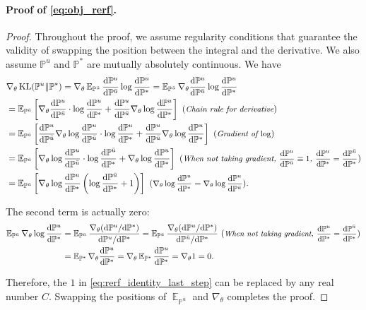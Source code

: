\documentclass{article}
\theoremstyle{remark}
\newcommand{\ro}[1]{\left(#1\right)} %
\newcommand{\sq}[1]{\left[#1\right]} %
\renewcommand{\P}{\mathbb{P}}
\newcommand{\E}{\operatorname{\mathbb{E}}}
\renewcommand{\d}{\mathrm{d}}
\newcommand{\de}[2]{\frac{\mathrm{d}#1}{\mathrm{d}#2}} %
\newcommand{\kl}{\operatorname{KL}}
\newcommand{\ub}{{\bar{u}}}
\begin{document}
\paragraph{Proof of \cref{eq:obj_rerf}.}
\begin{proof}
Throughout the proof, we assume regularity conditions that guarantee the validity of swapping the position between the integral and the derivative. We also assume $\P^u$ and $\P^*$ are mutually absolutely continuous. We have
\begin{align}
    &\nabla_\theta\kl(\P^u\|\P^*)=\nabla_\theta\E_{\P^\ub}\de{\P^u}{\P^\ub}\log\de{\P^u}{\P^*}=\E_{\P^\ub}\nabla_\theta\de{\P^u}{\P^\ub}\log\de{\P^u}{\P^*}\nonumber\\
    &=\E_{\P^\ub}\sq{\nabla_\theta\de{\P^u}{\P^\ub}\cdot\log\de{\P^u}{\P^*}+\de{\P^u}{\P^\ub}\nabla_\theta\log\de{\P^u}{\P^*}}~(\textit{\small Chain rule for derivative})\nonumber\\
    &=\E_{\P^\ub}\sq{\de{\P^u}{\P^\ub}\nabla_\theta\log\de{\P^u}{\P^\ub}\cdot\log\de{\P^u}{\P^*}+\de{\P^u}{\P^\ub}\nabla_\theta\log\de{\P^u}{\P^*}}\nonumber~(\textit{\small Gradient of $\log$})\\
    &=\E_{\P^\ub}\sq{\nabla_\theta\log\de{\P^u}{\P^\ub}\cdot\log\de{\P^\ub}{\P^*}+\nabla_\theta\log\de{\P^u}{\P^*}}~(\textit{\small When not taking gradient, $\de{\P^u}{\P^\ub}\equiv1$, $\de{\P^u}{\P^*}=\de{\P^\ub}{\P^*}$})\nonumber\\
    &=\E_{\P^\ub}\sq{\nabla_\theta\log\de{\P^u}{\P^*}\ro{\log\de{\P^\ub}{\P^*}+1}}~(\textit{\small $\nabla_\theta\log\de{\P^u}{\P^*}=\nabla_\theta\log\de{\P^u}{\P^\ub}$}).\label{eq:rerf_identity_last_step}
\end{align}

The second term is actually zero:
\begin{align*}
    \E_{\P^\ub}\nabla_\theta\log\de{\P^u}{\P^*}&=\E_{\P^\ub}\frac{\nabla_\theta(\d\P^u/\d\P^*)}{\d\P^u/\d\P^*}=\E_{\P^\ub}\frac{\nabla_\theta(\d\P^u/\d\P^*)}{\d\P^\ub/\d\P^*}~(\textit{\small When not taking gradient, $\de{\P^u}{\P^*}=\de{\P^\ub}{\P^*}$})\\
    &=\E_{\P^*}\nabla_\theta\de{\P^u}{\P^*}=\nabla_\theta\E_{\P^*}\de{\P^u}{\P^*}=\nabla_\theta1=0.
\end{align*}

Therefore, the $1$ in \cref{eq:rerf_identity_last_step} can be replaced by any real number $C$. Swapping the positions of $\E_{\P^\ub}$ and $\nabla_\theta$ completes the proof.
\end{proof}
\end{document}
